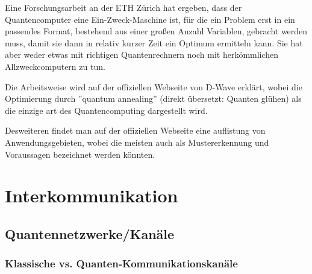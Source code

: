 
Eine Forschungsarbeit an der ETH Zürich hat ergeben, dass der Quantencomputer eine Ein-Zweck-Maschine ist, für die ein Problem erst in ein passendes Format, bestehend aus einer großen Anzahl Variablen, gebracht werden muss, damit sie dann in relativ kurzer Zeit ein Optimum ermitteln kann. Sie hat aber weder etwas mit richtigen Quantenrechnern noch mit herkömmlichen Allzweckcomputern zu tun.


Die Arbeitsweise wird auf der offiziellen Webseite von D-Wave erklärt, wobei die Optimierung durch ''quantum annealing'' (direkt übersetzt: Quanten glühen) als die einzige art des Quantencomputing dargestellt wird.


Desweiteren findet man auf der offiziellen Webseite eine auflistung von Anwendungsgebieten, wobei die meisten auch als Mustererkennung und Voraussagen bezeichnet werden könnten.









\newpage

\section{Interkommunikation}
\label{sec:interkommunikation}

\subsection{Quantennetzwerke/Kanäle}
\label{sec:Quantennetzwerke/Kanaele}

\subsubsection{Klassische vs. Quanten-Kommunikationskanäle}
\label{sec:Klassische vs. Quanten-Kommunikationskanaele}

